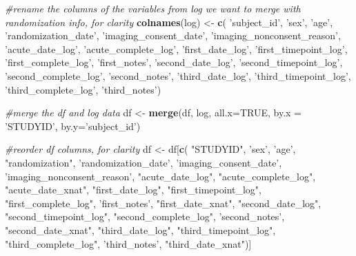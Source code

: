 \documentclass[]{article}
\newenvironment{Shaded}{\begin{snugshade}}{\end{snugshade}}
\newcommand{\KeywordTok}[1]{\textcolor[rgb]{0.13,0.29,0.53}{\textbf{#1}}}
\newcommand{\DataTypeTok}[1]{\textcolor[rgb]{0.13,0.29,0.53}{#1}}
\newcommand{\StringTok}[1]{\textcolor[rgb]{0.31,0.60,0.02}{#1}}
\newcommand{\CommentTok}[1]{\textcolor[rgb]{0.56,0.35,0.01}{\textit{#1}}}
\newcommand{\OtherTok}[1]{\textcolor[rgb]{0.56,0.35,0.01}{#1}}
\newcommand{\NormalTok}[1]{#1}
\theoremstyle{definition}
\theoremstyle{definition}
\theoremstyle{definition}
\theoremstyle{remark}
\begin{document}
\begin{Shaded}
\begin{Highlighting}[]
\CommentTok{#rename the columns of the variables from log we want to merge with randomization info, for clarity}
\KeywordTok{colnames}\NormalTok{(log) <-}\StringTok{ }\KeywordTok{c}\NormalTok{(}
  \StringTok{'subject_id'}\NormalTok{, }
  \StringTok{'sex'}\NormalTok{,}
  \StringTok{'age'}\NormalTok{,}
  \StringTok{'randomization_date'}\NormalTok{,}
  \StringTok{'imaging_consent_date'}\NormalTok{,}
  \StringTok{'imaging_nonconsent_reason'}\NormalTok{,}
  \StringTok{'acute_date_log'}\NormalTok{,}
  \StringTok{'acute_complete_log'}\NormalTok{,}
  \StringTok{'first_date_log'}\NormalTok{,}
  \StringTok{'first_timepoint_log'}\NormalTok{,}
  \StringTok{'first_complete_log'}\NormalTok{,}
  \StringTok{'first_notes'}\NormalTok{,}
  \StringTok{'second_date_log'}\NormalTok{,}
  \StringTok{'second_timepoint_log'}\NormalTok{,}
  \StringTok{'second_complete_log'}\NormalTok{,}
  \StringTok{'second_notes'}\NormalTok{,}
  \StringTok{'third_date_log'}\NormalTok{,}
  \StringTok{'third_timepoint_log'}\NormalTok{,}
  \StringTok{'third_complete_log'}\NormalTok{,}
  \StringTok{'third_notes'}\NormalTok{)}

\CommentTok{#merge the df and log data}
\NormalTok{df <-}\StringTok{ }\KeywordTok{merge}\NormalTok{(df, log, }\DataTypeTok{all.x=}\OtherTok{TRUE}\NormalTok{, }\DataTypeTok{by.x =} \StringTok{'STUDYID'}\NormalTok{, }\DataTypeTok{by.y=}\StringTok{'subject_id'}\NormalTok{)}

\CommentTok{#reorder df columns, for clarity}
\NormalTok{df <-}\StringTok{ }\NormalTok{df[}\KeywordTok{c}\NormalTok{(}
  \StringTok{"STUDYID"}\NormalTok{,      }
  \StringTok{'sex'}\NormalTok{, }
  \StringTok{'age'}\NormalTok{,}
  \StringTok{"randomization"}\NormalTok{,     }
  \StringTok{'randomization_date'}\NormalTok{,}
  \StringTok{'imaging_consent_date'}\NormalTok{,}
  \StringTok{'imaging_nonconsent_reason'}\NormalTok{,}
  \StringTok{"acute_date_log"}\NormalTok{,       }
  \StringTok{"acute_complete_log"}\NormalTok{, }
  \StringTok{"acute_date_xnat"}\NormalTok{,   }
  \StringTok{"first_date_log"}\NormalTok{,      }
  \StringTok{"first_timepoint_log"}\NormalTok{,  }
  \StringTok{"first_complete_log"}\NormalTok{, }
  \StringTok{'first_notes'}\NormalTok{, }
  \StringTok{"first_date_xnat"}\NormalTok{,}
  \StringTok{"second_date_log"}\NormalTok{,     }
  \StringTok{"second_timepoint_log"}\NormalTok{, }
  \StringTok{"second_complete_log"}\NormalTok{, }
  \StringTok{'second_notes'}\NormalTok{,}
  \StringTok{"second_date_xnat"}\NormalTok{,}
  \StringTok{"third_date_log"}\NormalTok{,      }
  \StringTok{"third_timepoint_log"}\NormalTok{,  }
  \StringTok{"third_complete_log"}\NormalTok{,}
  \StringTok{'third_notes'}\NormalTok{,}
  \StringTok{"third_date_xnat"}\NormalTok{)]}


\end{Highlighting}
\end{Shaded}
\end{document}
